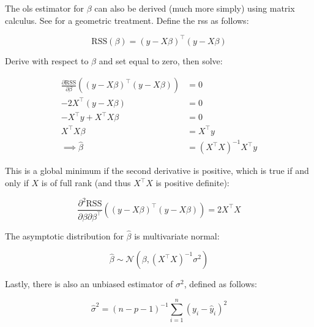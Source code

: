 \documentclass{report}
\begin{document}
The \gls{ols} estimator for $\beta$ can also be derived (much more simply) using matrix calculus. See \cite[Chapter~3.2]{hastie_elements_2009} for a geometric treatment. Define the \gls{rss} as follows:

\begin{equation}\label{eq:ex-ols-model-rss-matrix}
    \text{RSS}(\beta) = (y - X\beta)^\intercal (y - X\beta)
\end{equation}

Derive with respect to $\beta$ and set equal to zero, then solve:

\begin{equation}\label{eq:ex-ols-matrix-solution-beta}
    \begin{aligned}
        \frac{\partial\text{RSS}}{\partial\beta} \left((y - X\beta)^\intercal (y - X\beta)\right) &= 0 \\
        -2X^\intercal(y - X\beta) &= 0 \\
        -X^\intercal y + X^\intercal X \beta &= 0 \\
        X^\intercal X \beta &= X^\intercal y \\
        \implies \hat{\beta} &= \left(X^\intercal X\right)^{-1} X^\intercal y
    \end{aligned}
\end{equation}

This is a global minimum if the second derivative is positive, which is true if and only if $X$ is of full rank (and thus $X^\intercal X$ is positive definite):

\begin{equation}\label{eq:ex-ols-model-matrix-pd}
    \frac{\partial^2\text{RSS}}{\partial\beta\partial\beta^\intercal} \left((y - X\beta)^\intercal (y - X\beta)\right) = 2X^\intercal X
\end{equation}

The asymptotic distribution for $\hat{\beta}$ is multivariate normal:

\begin{equation}\label{eq:ex-ols-beta-hat-asymptotics}
    \hat{\beta} \sim \mathcal{N}\left(\beta, \left(X^\intercal X\right)^{-1}\sigma^2\right)
\end{equation}

Lastly, there is also an unbiased estimator of $\sigma^2$, defined as follows:

\begin{equation}\label{eq:ex-ols-unbiased-sigma-squared-hat}
    \hat{\sigma}^2 = (n - p - 1)^{-1} \sum_{i=1}^n \left(y_i - \hat{y}_i\right)^2
\end{equation}
\end{document}
